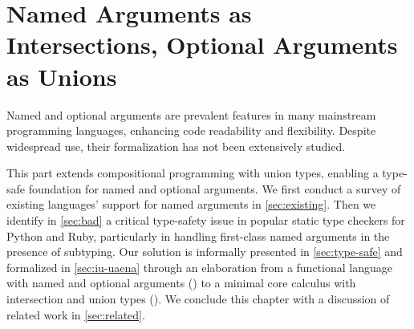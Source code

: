 \chapter{Named Arguments as Intersections, Optional Arguments as Unions} \label{ch:arguments}

Named and optional arguments are prevalent features in many mainstream
programming languages, enhancing code readability and flexibility. Despite
widespread use, their formalization has not been extensively studied.

This part extends compositional programming with union types, enabling a
type-safe foundation for named and optional arguments. We first conduct a survey
of existing languages' support for named arguments in \autoref{sec:existing}.
Then we identify in \autoref{sec:bad} a critical type-safety issue in popular
static type checkers for Python and Ruby, particularly in handling first-class
named arguments in the presence of subtyping. Our solution is informally
presented in \autoref{sec:type-safe} and formalized in \autoref{sec:iu-uaena}
through an elaboration from a functional language with named and optional
arguments (\uaena) to a minimal core calculus with intersection and union types
(\lambdaiu). We conclude this chapter with a discussion of related work in
\autoref{sec:related}.






